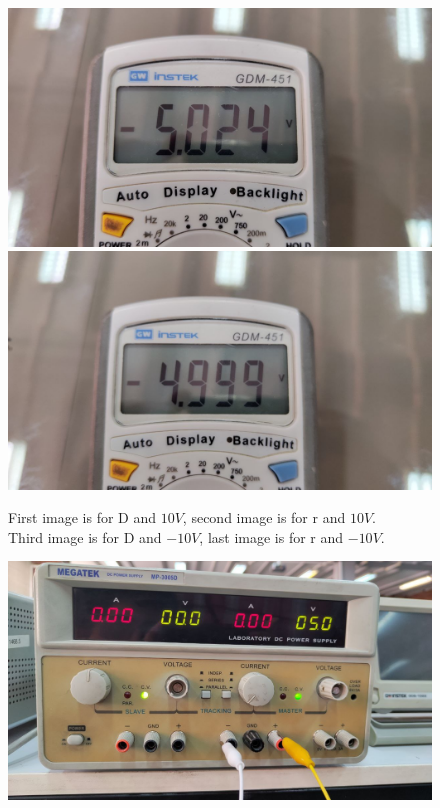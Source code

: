 \documentclass[11pt]{article}
\newcommand{\PicScale}{0.2}
\begin{document}
\begin{question}
\begin{subquestion}
{\begin{figure}[H]
                \includegraphics[scale=0.08,angle=0]{Fig/12.jpeg}
                \includegraphics[scale=0.08,angle=0]{Fig/13.jpeg}
                \caption{First image is for D and $10V$, second image is for r and $10V$. \\
                    \hspace*{14mm} Third image is for D and $-10V$, last image is for r and $-10V$.}
            \end{figure}
            \begin{figure}[H]
                \centering
                \includegraphics[scale=\PicScale,angle=0]{Fig/14.jpeg}

\end{figure}}
\end{subquestion}
\end{question}
\end{document}
